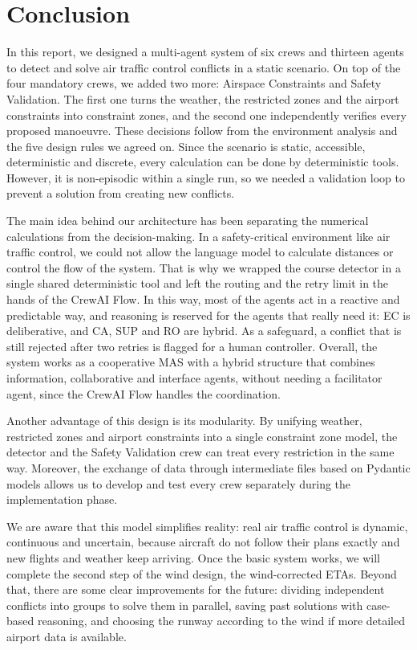 \section{Conclusion}
\label{sec:conclusion}

In this report, we designed a multi-agent system of six crews and thirteen agents to detect
and solve air traffic control conflicts in a static scenario. On top of the four mandatory
crews, we added two more: Airspace Constraints and Safety Validation. The first one turns
the weather, the restricted zones and the airport constraints into constraint zones, and the
second one independently verifies every proposed manoeuvre. These decisions follow from the
environment analysis and the five design rules we agreed on. Since the scenario is static,
accessible, deterministic and discrete, every calculation can be done by deterministic
tools. However, it is non-episodic within a single run, so we needed a validation loop to
prevent a solution from creating new conflicts.

The main idea behind our architecture has been separating the numerical calculations from
the decision-making. In a safety-critical environment like air traffic control, we could not
allow the language model to calculate distances or control the flow of the system. That is
why we wrapped the course detector in a single shared deterministic tool and left the
routing and the retry limit in the hands of the CrewAI Flow. In this way, most of the agents
act in a reactive and predictable way, and reasoning is reserved for the agents that really
need it: EC is deliberative, and CA, SUP and RO are hybrid. As a safeguard, a conflict that
is still rejected after two retries is flagged for a human controller. Overall, the system
works as a cooperative MAS with a hybrid structure that combines information, collaborative
and interface agents, without needing a facilitator agent, since the CrewAI Flow handles
the coordination.

Another advantage of this design is its modularity. By unifying weather, restricted zones
and airport constraints into a single constraint zone model, the detector and the Safety
Validation crew can treat every restriction in the same way. Moreover, the exchange of data
through intermediate files based on Pydantic models allows us to develop and test every crew
separately during the implementation phase.

We are aware that this model simplifies reality: real air traffic control is dynamic,
continuous and uncertain, because aircraft do not follow their plans exactly and new
flights and weather keep arriving. Once the basic system works, we will complete the second
step of the wind design, the wind-corrected ETAs. Beyond that, there are some clear
improvements for the future: dividing independent conflicts into groups to solve them in
parallel, saving past solutions with case-based reasoning, and choosing the runway according
to the wind if more detailed airport data is available.
